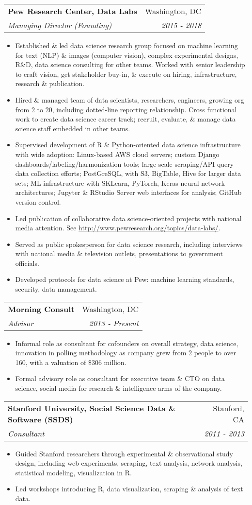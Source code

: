 \documentclass[letterpaper,11pt]{article}
\makeatletter
\newcommand{\resitem}[1]{\item #1 \vspace{-6pt}}
\newcommand{\ressubheading}[4]{\vspace{2pt}
\begin{tabular*}{7.58in}{l@{\extracolsep{\fill}}r}
		\textbf{#1} & #2 \\
		\textit{#3} & \textit{#4} \\
\end{tabular*}\vspace{-1pt}}
\makeatother
\begin{document}
\ressubheading{Pew Research Center, Data Labs}{Washington, DC}{Managing Director (Founding)}{2015 - 2018}
	\begin{itemize}
		\resitem{Established \& led data science research group focused on machine learning for text (NLP) \& images (computer vision), complex experimental designs, R\&D, data science consulting for other teams. Worked with senior leadership to craft vision, get stakeholder buy-in, \& execute on hiring, infrastructure, research \& publication.}
        \resitem{Hired \& managed team of data scientists, researchers, engineers, growing org from 2 to 20, including dotted-line reporting relationship. Cross functional work to create data science career track; recruit, evaluate, \& manage data science staff embedded in other teams.}
        \resitem{Supervised development of R \& Python-oriented data science infrastructure with wide adoption: Linux-based AWS cloud servers; custom Django dashboards/labeling/harmonization tools; large scale scraping/API query data collection efforts; PostGreSQL, with S3, BigTable, Hive for larger data sets; ML infrastructure with SKLearn, PyTorch, Keras neural network architectures; Jupyter \& RStudio Server web interfaces for analysis; GitHub version control.}
        \resitem{Led publication of collaborative data science-oriented projects with national media attention. See \url{http://www.pewresearch.org/topics/data-labs/}.}
        \resitem{Served as public spokesperson for data science research, including interviews with national media \& television outlets, presentations to government officials.}
		\resitem{Developed protocols for data science at Pew: machine learning standards, security, data management.}
	\end{itemize}

\ressubheading{Morning Consult}{Washington, DC}{Advisor}{2013 - Present}
	\begin{itemize}
		\resitem{Informal role as consultant for cofounders on overall strategy, data science, innovation in polling methodology as company grew from 2 people to over 160, with a valuation of \$306 million. }
		\resitem{Formal advisory role as consultant for executive team \& CTO on data science, social media for research \& intelligence arms of the company.}	
    \end{itemize}

\ressubheading{Stanford University, Social Science Data \& Software (SSDS)}{Stanford, CA}{Consultant}{2011 - 2013}
	\begin{itemize}
		\resitem{Guided Stanford researchers through experimental \& observational study design, including web experiments, scraping, text analysis, network analysis, statistical modeling, visualization in R.}
		\resitem{Led workshops introducing R, data visualization, scraping \& analysis of text data.} 
	\end{itemize}
\end{document}
